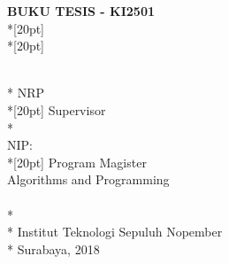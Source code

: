 \newpage

  \sffamily
  \thispagestyle{empty}
  \begin{spacing}{2.0}
    {\noindent
      \textbf{BUKU TESIS - KI2501}\\*[20pt]
      {\large\textbf{\MakeUppercase{\juduleng}}} \\*[20pt]
    }
  \end{spacing}
  \begin{spacing}{1.3}
  {\large \noindent
    \MakeUppercase{\penulis} \\*
    NRP \nrplama \\*[20pt]
    Supervisor\\*
    \pembimbingsatu \\
    NIP: \nikpembimbingsatu \\*[20pt]
    Program Magister\\
    Algorithms and Programming\\
    \MakeUppercase{\jurusanbarueng} \\*
    \fakultasbarueng \\*
    Institut Teknologi Sepuluh Nopember \\*
    Surabaya, 2018
  }
  \end{spacing}
  \rmfamily
  \normalsize
  \restoregeometry
  \cleardoublepage